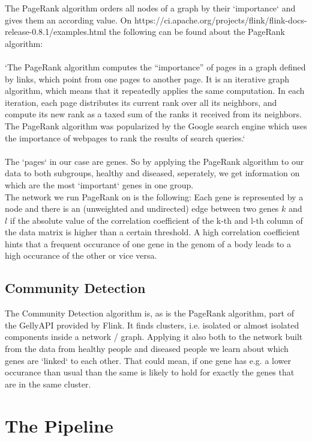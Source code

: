 \documentclass{bioinfo}
\begin{document}
The PageRank algorithm orders all nodes of a graph by their `importance` and gives them an according value.
On https://ci.apache.org/projects/flink/flink-docs-release-0.8.1/examples.html the following can be found about the PageRank algorithm:\\\\
`The PageRank algorithm computes the “importance” of pages in a graph defined by links, which point from one pages to another page. It is an iterative graph algorithm, which means that it repeatedly applies the same computation. In each iteration, each page distributes its current rank over all its neighbors, and compute its new rank as a taxed sum of the ranks it received from its neighbors. The PageRank algorithm was popularized by the Google search engine which uses the importance of webpages to rank the results of search queries.`\\\\
The `pages` in our case are genes. So by applying the PageRank algorithm to our data to both subgroups, healthy and diseased, seperately, we get information on which are the most `important` genes in one group.\\
The network we run PageRank on is the following: Each gene is represented by a node and there is an (unweighted and undirected) edge between two genes $k$ and $l$ if the absolute value of the correlation coefficient of the k-th and l-th column of the data matrix is higher than a certain threshold. A high correlation coefficient hints that a frequent occurance of one gene in the genom of a body leads to a high occurance of the other or vice versa.


\subsection{Community Detection}
The Community Detection algorithm is, as is the PageRank algorithm, part of the GellyAPI provided by Flink. It finds clusters, i.e. isolated or almost isolated components inside a network / graph. Applying it also both to the network built from the data from healthy people and diseased people we learn about which genes are `linked` to each other. That could mean, if one gene has e.g. a lower occurance than usual than the same is likely to hold for exactly the genes that are in the same cluster.
 


\section{The Pipeline}
\end{document}
